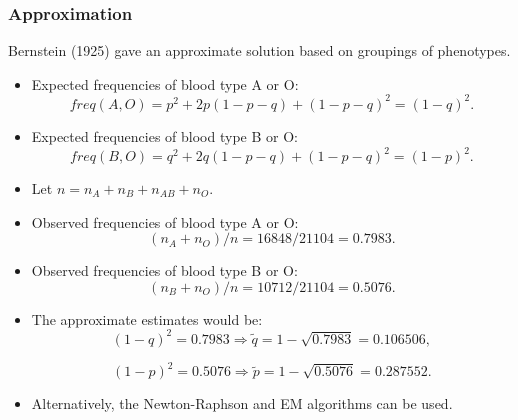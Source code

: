 \documentclass[10pt]{beamer}
\begin{document}
\begin{frame}
\frametitle{Approximation} 

Bernstein (1925) gave an approximate solution based on groupings of phenotypes. 
\bigskip

\begin{itemize}
\item Expected frequencies of blood type A or O:
$$freq(A, O)=p^2+2p(1-p-q)+(1-p-q)^2=(1-q)^2.$$
\smallskip
\item Expected frequencies of blood type B or O:
$$freq(B, O)=q^2+2q(1-p-q)+(1-p-q)^2=(1-p)^2.$$
\smallskip
\item Let $n=n_A+n_B+n_{AB}+n_O$.
\pagebreak
\item Observed frequencies of blood type A or O:
$$(n_A+n_O)/n=16848/21104=0.7983.$$
\item Observed frequencies of blood type B or O:
$$(n_B+n_O)/n=10712/21104=0.5076.$$
\smallskip
\item The approximate estimates would be:
$$(1-q)^2=0.7983 \Rightarrow \tilde q = 1-\sqrt{0.7983}=0.106506,$$

$$(1-p)^2=0.5076 \Rightarrow \tilde p = 1-\sqrt{0.5076}=0.287552.$$
\bigskip

\item Alternatively, the Newton-Raphson and EM algorithms can be used.
\end{itemize}

\end{frame}
\end{document}

